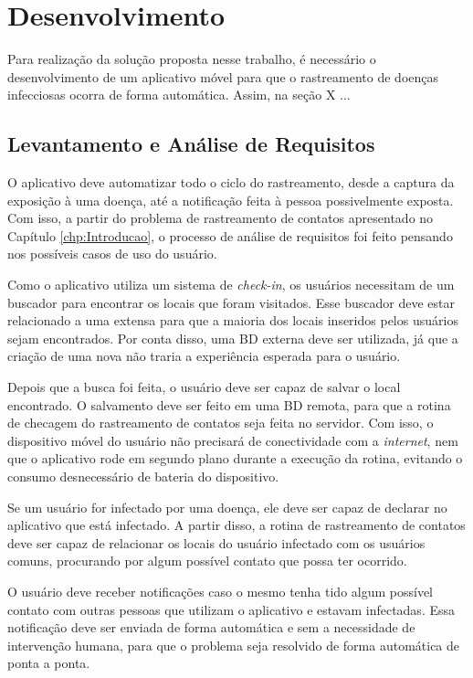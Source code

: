 \chapter{Desenvolvimento}\label{chp:desenvolvimento}

Para realização da solução proposta nesse trabalho, é necessário o desenvolvimento de um aplicativo móvel para que o rastreamento de doenças infecciosas ocorra de forma automática. Assim, na seção X ...

\section{Levantamento e Análise de Requisitos}\label{sec:requisitos}

O aplicativo deve automatizar todo o ciclo do rastreamento, desde a captura da exposição à uma doença, até a notificação feita à pessoa possivelmente exposta. Com isso, a partir do problema de rastreamento de contatos apresentado no Capítulo \ref{chp:Introducao}, o processo de análise de requisitos foi feito pensando nos possíveis casos de uso do usuário.

Como o aplicativo utiliza um sistema de \textit{check-in}, os usuários necessitam de um buscador para encontrar os locais que foram visitados. Esse buscador deve estar relacionado a uma extensa  para que a maioria dos locais inseridos pelos usuários sejam encontrados. Por conta disso, uma BD externa deve ser utilizada, já que a criação de uma nova não traria a experiência esperada para o usuário.

Depois que a busca foi feita, o usuário deve ser capaz de salvar o local encontrado. O salvamento deve ser feito em uma BD remota, para que a rotina de checagem do rastreamento de contatos seja feita no servidor. Com isso, o dispositivo móvel do usuário não precisará de conectividade com a \textit{internet}, nem que o aplicativo rode em segundo plano durante a execução da rotina, evitando o consumo desnecessário de bateria do dispositivo.

Se um usuário for infectado por uma doença, ele deve ser capaz de declarar no aplicativo que está infectado. A partir disso, a rotina de rastreamento de contatos deve ser capaz de relacionar os locais do usuário infectado com os usuários comuns, procurando por algum possível contato que possa ter ocorrido.

O usuário deve receber notificações caso o mesmo tenha tido algum possível contato com outras pessoas que utilizam o aplicativo e estavam infectadas. Essa notificação deve ser enviada de forma automática e sem a necessidade de intervenção humana, para que o problema seja resolvido de forma automática de ponta a ponta.

